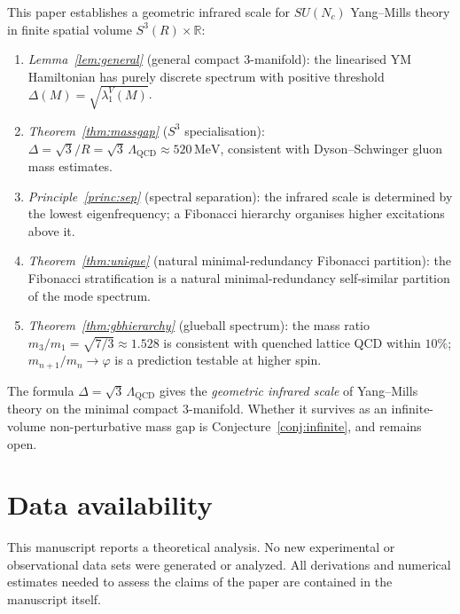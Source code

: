 \documentclass[
  aps,
  prd,
  reprint,
  superscriptaddress,
  nofootinbib,
  longbibliography,
  amsmath,
  amssymb
]{revtex4-2}
\theoremstyle{plain}
\theoremstyle{definition}
\theoremstyle{remark}
\newcommand{\vp}{\varphi}
\newcommand{\Lqcd}{\Lambda_{\mathrm{QCD}}}
\newcommand{\SU}[1]{SU(#1)}
\begin{document}
This paper establishes a geometric infrared scale for $\SU{N_c}$
Yang--Mills theory in finite spatial volume $S^3(R)\times\mathbb{R}$:

\begin{enumerate}
\item \emph{Lemma~\ref{lem:general}} (general compact 3-manifold):
  the linearised YM Hamiltonian has purely discrete spectrum with
  positive threshold $\Delta(M)=\sqrt{\lambda_1^V(M)}$.

\item \emph{Theorem~\ref{thm:massgap}} ($S^3$ specialisation):
  $\Delta=\sqrt3/R=\sqrt3\,\Lqcd\approx520\,\mathrm{MeV}$, consistent
  with Dyson--Schwinger gluon mass estimates.

\item \emph{Principle~\ref{princ:sep}} (spectral separation): the
  infrared scale is determined by the lowest eigenfrequency; a
  Fibonacci hierarchy organises higher excitations above it.

\item \emph{Theorem~\ref{thm:unique}} (natural minimal-redundancy Fibonacci partition):
  the Fibonacci stratification is a natural minimal-redundancy
  self-similar partition of the mode spectrum.

\item \emph{Theorem~\ref{thm:gbhierarchy}} (glueball spectrum): the
  mass ratio $m_3/m_1=\sqrt{7/3}\approx1.528$ is consistent with
  quenched lattice QCD within $10\%$; $m_{n+1}/m_n\to\vp$ is a
  prediction testable at higher spin.
\end{enumerate}

\medskip
The formula $\Delta=\sqrt3\,\Lqcd$ gives the \emph{geometric infrared
scale} of Yang--Mills theory on the minimal compact 3-manifold.
Whether it survives as an infinite-volume non-perturbative mass gap
is Conjecture~\ref{conj:infinite}, and remains open.


\section*{Data availability}
This manuscript reports a theoretical analysis. No new experimental or observational data sets were generated or analyzed. All derivations and numerical estimates needed to assess the claims of the paper are contained in the manuscript itself.
\end{document}
